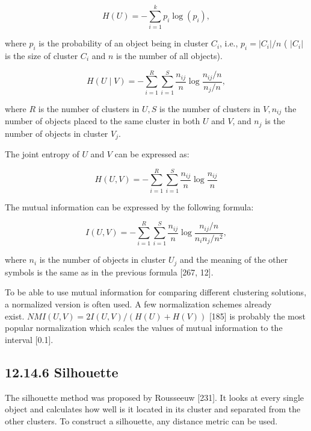 \documentclass[10pt]{book}
\begin{document}
\begin{equation*}
H(U)=-\sum_{i=1}^{k} p_{i} \log \left(p_{i}\right), \tag{12.51}
\end{equation*}


where $p_{i}$ is the probability of an object being in cluster $C_{i}$, i.e., $p_{i}=\left|C_{i}\right| / n$ ( $\left|C_{i}\right|$ is the size of cluster $C_{i}$ and $n$ is the number of all objects).


\begin{equation*}
H(U \mid V)=-\sum_{i=1}^{R} \sum_{i=1}^{S} \frac{n_{i j}}{n} \log \frac{n_{i j} / n}{n_{j} / n}, \tag{12.52}
\end{equation*}


where $R$ is the number of clusters in $U, S$ is the number of clusters in $V, n_{i j}$ the number of objects placed to the same cluster in both $U$ and $V$, and $n_{j}$ is the number of objects in cluster $V_{j}$.

The joint entropy of $U$ and $V$ can be expressed as:


\begin{equation*}
H(U, V)=-\sum_{i=1}^{R} \sum_{i=1}^{S} \frac{n_{i j}}{n} \log \frac{n_{i j}}{n} \tag{12.53}
\end{equation*}


The mutual information can be expressed by the following formula:


\begin{equation*}
I(U, V)=-\sum_{i=1}^{R} \sum_{i=1}^{S} \frac{n_{i j}}{n} \log \frac{n_{i j} / n}{n_{i} n_{j} / n^{2}}, \tag{12.54}
\end{equation*}


where $n_{i}$ is the number of objects in cluster $U_{j}$ and the meaning of the other symbols is the same as in the previous formula [267, 12].

To be able to use mutual information for comparing different clustering solutions, a normalized version is often used. A few normalization schemes already\\
exist. $N M I(U, V)=2 I(U, V) /(H(U)+H(V))$ [185] is probably the most popular normalization which scales the values of mutual information to the interval [0.1].

\subsection*{12.14.6 Silhouette}
The silhouette method was proposed by Rousseeuw [231]. It looks at every single object and calculates how well is it located in its cluster and separated from the other clusters. To construct a silhouette, any distance metric can be used.
\end{document}

